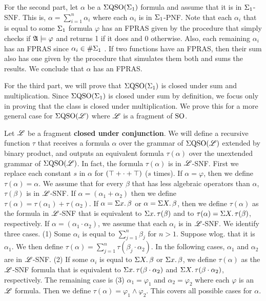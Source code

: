 \vspace{1em}
For the second part, let $\alpha$ be a $\Sigma{\rm QSO}(\Sigma_{1})$ formula and assume that it is in $\Sigma_{1}$-SNF. This is, $\alpha = \sum_{i = 1}^n\alpha_i$ where each $\alpha_i$ is in $\Sigma_{1}$-PNF. Note that each $\alpha_i$ that is equal to some $\Sigma_{1}$ formula $\varphi$ has an FPRAS given by the procedure that simply checks if $\mathfrak{A}\models\varphi$ and returns 1 if it does and 0 otherwise. Also, each remaining $\alpha_i$ has an FPRAS since $\alpha_i\in \#\Sigma_{1}$ \cite{SalujaST95}. If two functions have an FPRAS, then their sum also has one given by the procedure that simulates them both and sums the results. We conclude that $\alpha$ has an FPRAS.

\vspace{2em}
For the third part, we will prove that $\Sigma{\rm QSO}(\Sigma_{1})$ is closed under sum and multiplication. Since $\Sigma{\rm QSO}(\Sigma_{1})$ is closed under sum by definition, we focus only in proving that the class is closed under multiplication. We prove this for a more general case for $\Sigma{\rm QSO}(\mathscr{L})$ where $\mathscr{L}$ is a fragment of ${\rm SO}$.

Let $\mathscr{L}$ be a fragment {\bf closed under conjunction}. We will define a recursive function $\tau$ that receives a formula $\alpha$ over the grammar of $\Sigma{\rm QSO}(\mathscr{L})$ extended by binary product, and outputs an equivalent formula $\tau(\alpha)$ over the unextended grammar of $\Sigma{\rm QSO}(\mathscr{L})$. In fact, the formula $\tau(\alpha)$ is in $\mathscr{L}$-SNF. First we replace each constant $s$ in $\alpha$ for $(\top + \cdot + \top)$ ($s$ times). If $\alpha = \varphi$, then we define $\tau(\alpha) = \alpha$. We assume that for every $\beta$ that has less algebraic operators than $\alpha$, $\tau(\beta)$ is in $\mathscr{L}$-SNF. If $\alpha = (\alpha_1 + \alpha_2)$ then we define $\tau(\alpha) = \tau(\alpha_1) + \tau(\alpha_2)$. If $\alpha = \Sigma{x}.\,\beta$ or $\alpha = \Sigma{X}.\,\beta$, then we define $\tau(\alpha)$ as the formula in $\mathscr{L}$-SNF that is equivalent to $\Sigma{x}.\,\tau(\beta)$ and to $\tau(\alpha) = \Sigma{X}.\,\tau(\beta)$, respectively. If $\alpha = (\alpha_1 \cdot \alpha_2)$, we assume that each $\alpha_i$ is in $\mathscr{L}$-SNF. We identify three cases. (1) Some $\alpha_i$ is equal to $\sum_{j = 1}^n\beta_j$ for $n > 1$. Suppose wlog. that it is $\alpha_1$. We then define $\tau(\alpha) = \sum_{j = 1}^n\tau(\beta_j\cdot\alpha_2)$. In the following cases, $\alpha_1$ and $\alpha_2$ are in $\mathscr{L}$-SNF. (2) If some $\alpha_i$ is equal to $\Sigma{X}.\,\beta$ or $\Sigma{x}.\,\beta$, we define $\tau(\alpha)$ as the $\mathscr{L}$-SNF formula that is equivalent to $\Sigma{x}.\,\tau(\beta\cdot\alpha_2)$ and $\Sigma{X}.\,\tau(\beta\cdot\alpha_2)$, respectively. The remaining case is (3) $\alpha_1 = \varphi_1$ and $\alpha_2 = \varphi_2$ where each $\varphi$ is an $\mathscr{L}$ formula. Then we define $\tau(\alpha) = \varphi_1 \wedge \varphi_2$. This covers all possible cases for $\alpha$. 

